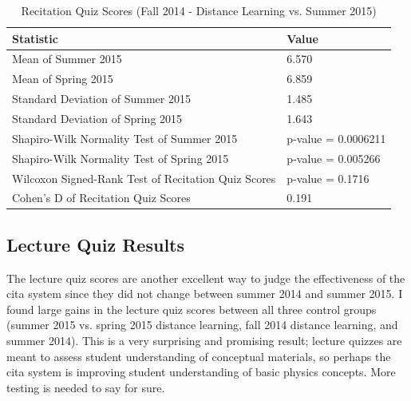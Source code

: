 \begin{small}
\begin{table}
  \centering
  \begin{tabular}{|l|l|}
    \hline
    \textbf{Statistic} & \textbf{Value} \\
	\hline
	Mean of Summer 2015 & 6.570 \\
	\hline
	Mean of Spring 2015 & 6.859 \\
	\hline
	Standard Deviation of Summer 2015 & 1.485 \\
	\hline
	Standard Deviation of Spring 2015 & 1.643 \\
	\hline
	Shapiro-Wilk Normality Test of Summer 2015 & p-value = 0.0006211 \\
	\hline
	Shapiro-Wilk Normality Test of Spring 2015 & p-value = 0.005266 \\
	\hline
	Wilcoxon Signed-Rank Test of Recitation Quiz Scores & p-value = 0.1716 \\
	\hline
	Cohen's D of Recitation Quiz Scores & 0.191 \\
	\hline
  \end{tabular}
	\caption[Recitation Quiz Scores (Fall 2014 - Distance Learning vs. Summer 2015)]{Recitation Quiz Scores (Fall 2014 - Distance Learning vs. Summer 2015)}
  \label{tab:rqf14dSu15}
\end{table}
\end{small}

\subsection{Lecture Quiz Results}

The lecture quiz scores are another excellent way to judge the effectiveness of the \gls{cita} system since they did not change between summer 2014 and summer 2015. I found large gains in the lecture quiz scores between all three control groups (summer 2015 vs. spring 2015 distance learning, fall 2014 distance learning, and summer 2014). This is a very surprising and promising result; lecture quizzes are meant to assess student understanding of conceptual materials, so perhaps the \gls{cita} system is improving student understanding of basic physics concepts. More testing is needed to say for sure.

